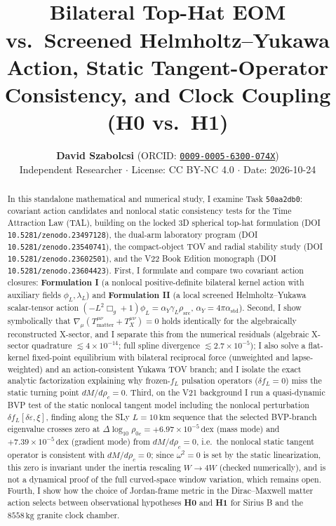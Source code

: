 \documentclass[10pt,a4paper]{article}
\title{\vspace{-10mm}{\bfseries\color{navy}Covariant Action Candidates and Nonlocal Static Consistency Tests for the Time Attraction Law (Task \texttt{50aa2db0})}\\[4pt]
{\normalsize Bilateral Top-Hat EOM vs.\ Screened Helmholtz--Yukawa Action, Static Tangent-Operator Consistency, and Clock Coupling (H0 vs.\ H1)}}
\author{\textbf{David Szabolcsi} \quad (ORCID: \href{https://orcid.org/0009-0005-6300-074X}{\texttt{0009-0005-6300-074X}})\\
{\small Independent Researcher $\cdot$ License: CC BY-NC 4.0 $\cdot$ Date: 2026-10-24}}
\date{}
\begin{document}
\maketitle
\vspace{-6mm}

\begin{abstract}\noindent
In this standalone mathematical and numerical study, I examine Task \texttt{50aa2db0}: covariant action candidates and nonlocal static consistency tests for the Time Attraction Law (TAL), building on the locked 3D spherical top-hat formulation (DOI \texttt{10.5281/zenodo.23497128}), the dual-arm laboratory program (DOI \texttt{10.5281/zenodo.23540741}), the compact-object TOV and radial stability study (DOI \texttt{10.5281/zenodo.23602501}), and the V22 Book Edition monograph (DOI \texttt{10.5281/zenodo.23604423}). First, I formulate and compare two covariant action closures: \textbf{Formulation I} (a nonlocal positive-definite bilateral kernel action with auxiliary fields $\phi_L, \lambda_L$) and \textbf{Formulation II} (a local screened Helmholtz--Yukawa scalar-tensor action $(-L^2\Box_g+1)\phi_L=\alpha_Y\gamma_L\rho_{\text{src}}$, $\alpha_Y=4\pi\alpha_{\text{std}}$). Second, I show symbolically that $\nabla_\mu(T^{\mu\nu}_{\text{matter}} + T^{\mu\nu}_X) = 0$ holds identically for the algebraically reconstructed X-sector, and I separate this from the numerical residuals (algebraic X-sector quadrature $\lesssim 4\times 10^{-14}$; full spline divergence $\lesssim 2.7\times 10^{-5}$); I also solve a flat-kernel fixed-point equilibrium with bilateral reciprocal force (unweighted and lapse-weighted) and an action-consistent Yukawa TOV branch; and I isolate the exact analytic factorization explaining why frozen-$f_L$ pulsation operators ($\delta f_L = 0$) miss the static turning point $dM/d\rho_c = 0$. Third, on the V21 background I run a quasi-dynamic BVP test of the static nonlocal tangent model including the nonlocal perturbation $\delta f_L[\delta\varepsilon, \xi]$, finding along the SLy $L=10\,\text{km}$ sequence that the selected BVP-branch eigenvalue crosses zero at $\Delta\log_{10}\rho_{0c} = +6.97\times 10^{-5}\,\text{dex}$ (mass mode) and $+7.39\times 10^{-5}\,\text{dex}$ (gradient mode) from $dM/d\rho_c = 0$, i.e.\ the nonlocal static tangent operator is consistent with $dM/d\rho_c=0$; since $\omega^2=0$ is set by the static linearization, this zero is invariant under the inertia rescaling $W\to 4W$ (checked numerically), and is not a dynamical proof of the full curved-space window variation, which remains open. Fourth, I show how the choice of Jordan-frame metric in the Dirac--Maxwell matter action selects between observational hypotheses \textbf{H0} and \textbf{H1} for Sirius B and the $8558\,\text{kg}$ granite clock chamber.
\end{abstract}
\end{document}
